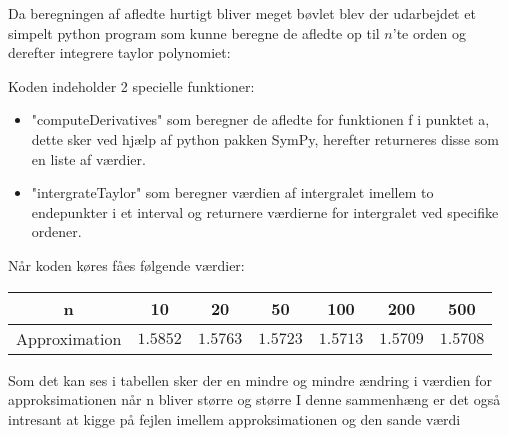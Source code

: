 Da beregningen af afledte hurtigt bliver meget bøvlet blev der udarbejdet et simpelt python program
som kunne beregne de afledte op til $n$'te orden og derefter integrere taylor polynomiet:

Koden indeholder 2 specielle funktioner:
\begin{itemize}
  \item "computeDerivatives" som beregner de afledte for funktionen f 
  i punktet a, dette sker ved hjælp af python pakken SymPy, herefter returneres disse som en liste af værdier.  
  \item "intergrateTaylor" som beregner værdien af intergralet imellem to endepunkter i et interval
  og returnere værdierne for intergralet ved specifike ordener. 
\end{itemize} 
Når koden køres fåes følgende værdier:
\begin{center}
  \begin{tabular}{ |c|c|c|c|c|c|c| }
    \hline
      n & 10 & 20 & 50 & 100 & 200 & 500 \\
    \hline
      Approximation & $1.5852$ & $1.5763$ & $1.5723$ & $1.5713$ & $1.5709$ & $1.5708$ \\
    \hline
  \end{tabular}
\end{center}
Som det kan ses i tabellen sker der en mindre og mindre ændring i værdien for approksimationen når n bliver større og større
I denne sammenhæng er det også intresant at kigge på 
fejlen imellem approksimationen og den sande værdi %